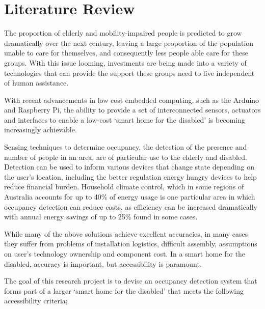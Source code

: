 \documentclass[../thesis/thesis.tex]{subfiles}
\begin{document}
\chapter{Literature Review}
\label{chap:litreview}

The proportion of elderly and mobility-impaired people is predicted to grow dramatically over the next century, leaving a large proportion of the population unable to care for themselves, and consequently less people able care for these groups. \cite{chan2009smart} With this issue looming, investments are being made into a variety of technologies that can provide the support these groups need to live independent of human assistance. 

With recent advancements in low cost embedded computing, such as the Arduino \cite{Ardunio} and Raspberry Pi, \cite{RPi} the ability to provide a set of interconnected sensors, actuators and interfaces to enable a low-cost `smart home for the disabled' is becoming increasingly achievable.

Sensing techniques to determine occupancy, the detection of the presence and number of people in an area, are of particular use to the elderly and disabled. Detection can be used to inform various devices that change state depending on the user's location, including the better regulation energy hungry devices to help reduce financial burden. Household climate control, which in some regions of Australia accounts for up to 40\% of energy usage \cite{abs4602} is one particular area in which occupancy detection can reduce costs, as efficiency can be increased dramatically with annual energy savings of up to 25\% found in some cases. \cite{beltran2013thermosense}
 
While many of the above solutions achieve excellent accuracies, in many cases they suffer from problems of installation logistics, difficult assembly, assumptions on user's technology ownership and component cost. In a smart home for the disabled, accuracy is important, but accessibility is paramount.

The goal of this research project is to devise an occupancy detection system that forms part of a larger `smart home for the disabled' that meets the following accessibility criteria;
\end{document}
